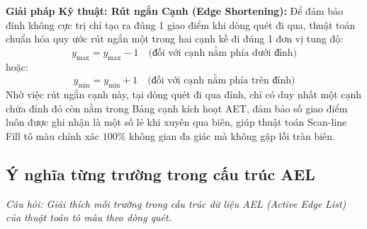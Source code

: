 \textbf{Giải pháp Kỹ thuật: Rút ngắn Cạnh (Edge Shortening):}
Để đảm bảo đỉnh không cực trị chỉ tạo ra đúng 1 giao điểm khi dòng quét đi qua, thuật toán chuẩn hóa quy ước rút ngắn một trong hai cạnh kề đi đúng 1 đơn vị tung độ:
\begin{equation}
y_{\max} = y_{\max} - 1 \quad \text{(đối với cạnh nằm phía dưới đỉnh)}
\end{equation}
hoặc:
\begin{equation}
y_{\min} = y_{\min} + 1 \quad \text{(đối với cạnh nằm phía trên đỉnh)}
\end{equation}
Nhờ việc rút ngắn cạnh này, tại dòng quét đi qua đỉnh, chỉ có duy nhất một cạnh chứa đỉnh đó còn nằm trong Bảng cạnh kích hoạt AET, đảm bảo số giao điểm luôn được ghi nhận là một số lẻ khi xuyên qua biên, giúp thuật toán Scan-line Fill tô màu chính xác $100\%$ không gian đa giác mà không gặp lỗi tràn biên.

\subsection{Ý nghĩa từng trường trong cấu trúc AEL}
\label{subsec:w5_ael}

\textit{Câu hỏi: Giải thích mỗi trường trong cấu trúc dữ liệu AEL (Active Edge List) của thuật toán tô màu theo dòng quét.}

